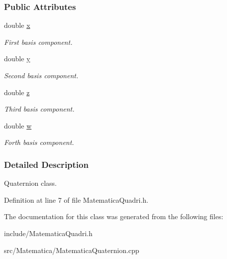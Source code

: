 \subsubsection*{Public Attributes}
\begin{DoxyCompactItemize}
\item 
double \hyperlink{classQuadri_af88b946fb90d5f08b5fb740c70e98c10}{x}\hypertarget{classQuadri_af88b946fb90d5f08b5fb740c70e98c10}{}\label{classQuadri_af88b946fb90d5f08b5fb740c70e98c10}

\begin{DoxyCompactList}\small\item\em First basis component. \end{DoxyCompactList}\item 
double \hyperlink{classQuadri_ab927965981178aa1fba979a37168db2a}{y}\hypertarget{classQuadri_ab927965981178aa1fba979a37168db2a}{}\label{classQuadri_ab927965981178aa1fba979a37168db2a}

\begin{DoxyCompactList}\small\item\em Second basis component. \end{DoxyCompactList}\item 
double \hyperlink{classQuadri_ab3e6ed577a7c669c19de1f9c1b46c872}{z}\hypertarget{classQuadri_ab3e6ed577a7c669c19de1f9c1b46c872}{}\label{classQuadri_ab3e6ed577a7c669c19de1f9c1b46c872}

\begin{DoxyCompactList}\small\item\em Third basis component. \end{DoxyCompactList}\item 
double \hyperlink{classQuadri_afb3248bab1c7ee0ad97e9d4c275b4c67}{w}\hypertarget{classQuadri_afb3248bab1c7ee0ad97e9d4c275b4c67}{}\label{classQuadri_afb3248bab1c7ee0ad97e9d4c275b4c67}

\begin{DoxyCompactList}\small\item\em Forth basis component. \end{DoxyCompactList}\end{DoxyCompactItemize}


\subsubsection{Detailed Description}
Quaternion class. 

Definition at line 7 of file Matematica\+Quadri.\+h.



The documentation for this class was generated from the following files\+:\begin{DoxyCompactItemize}
\item 
include/Matematica\+Quadri.\+h\item 
src/\+Matematica/Matematica\+Quaternion.\+cpp\end{DoxyCompactItemize}
